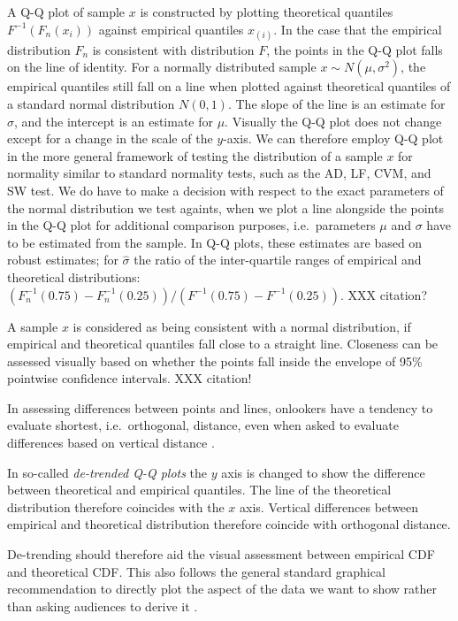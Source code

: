 \documentclass{article}\usepackage[]{graphicx}\usepackage[]{color}
\newcommand{\hh}[1]{{\color{magenta} #1}}
\newcommand{\hhnote}[1]{\todo[inline,color=magenta!40]{#1}}
\begin{document}
 \hh{A Q-Q plot of sample $x$ is constructed by plotting theoretical quantiles $F^{-1}(F_n(x_i))$ against empirical quantiles $x_{(i)}$. In the case that the empirical distribution $F_n$ is consistent with distribution $F$, the points in the Q-Q plot falls on the line of identity. 
 For a normally distributed sample $x \sim N(\mu, \sigma^2)$, the empirical quantiles still fall on a line when plotted against theoretical quantiles of a standard normal distribution $N(0,1)$. The slope of the line is an estimate for $\sigma$, and the intercept is an estimate for $\mu$. Visually the Q-Q plot does not change except for a change in the scale of the $y$-axis. We can therefore employ Q-Q plot in the more general framework of testing the distribution of a sample $x$ for normality similar to standard normality tests, such as the AD, LF, CVM, and SW test. We do have to make a decision with respect to the exact parameters of the normal distribution we test againts, when we plot a line alongside the points in the Q-Q plot for additional comparison purposes, i.e.~parameters $\mu$ and $\sigma$ have to be estimated from the sample. In Q-Q plots, these estimates are based on robust estimates; for $\widehat{\sigma}$ the ratio of the inter-quartile ranges of empirical and theoretical distributions: $\left(F^{-1}_n(0.75) - F^{-1}_n(0.25)\right) / \left(F^{-1}(0.75) - F^{-1}(0.25)\right)$. XXX citation?
 }

\hh{A sample $x$ is considered as being consistent with a normal distribution, if empirical and theoretical quantiles fall close to  a straight line.  Closeness can  be assessed visually based on whether the points fall inside the envelope of 95\%  pointwise confidence intervals. XXX citation!  }

\hh{
In assessing differences between points and lines, onlookers have a tendency to evaluate shortest, i.e.~orthogonal, distance, even when asked to evaluate differences based on vertical distance \citep{sineillusion, robbins:2005, cleveland:1984}. 

In so-called {\it de-trended Q-Q plots} the $y$ axis is changed to show the difference between theoretical and empirical quantiles. The line of the theoretical distribution therefore coincides with the $x$ axis. Vertical differences between empirical and theoretical distribution therefore  coincide with orthogonal distance. 

De-trending should therefore aid the visual assessment between empirical CDF and theoretical CDF. This also follows the general standard graphical recommendation to directly plot the aspect of the data we want to show rather than asking audiences to derive it \citep{wainer:2000}.
}
\end{document}
